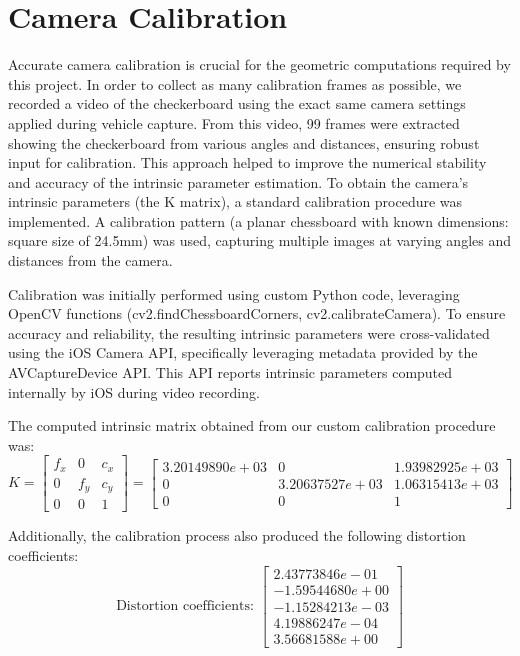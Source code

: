 \section{Camera Calibration}
Accurate camera calibration is crucial for the geometric computations required by this project. In order to collect as many calibration frames as possible, we recorded a video of the checkerboard using the exact same camera settings applied during vehicle capture. From this video, 99 frames were extracted showing the checkerboard from various angles and distances, ensuring robust input for calibration. This approach helped to improve the numerical stability and accuracy of the intrinsic parameter estimation. To obtain the camera's intrinsic parameters (the K matrix), a standard calibration procedure was implemented. A calibration pattern (a planar chessboard with known dimensions: square size of 24.5mm) was used, capturing multiple images at varying angles and distances from the camera.

Calibration was initially performed using custom Python code, leveraging OpenCV functions (cv2.findChessboardCorners, cv2.calibrateCamera). To ensure accuracy and reliability, the resulting intrinsic parameters were cross-validated using the iOS Camera API, specifically leveraging metadata provided by the AVCaptureDevice API. This API reports intrinsic parameters computed internally by iOS during video recording.

The computed intrinsic matrix  obtained from our custom calibration procedure was:
\begin{equation}
    K = \begin{bmatrix}
        f_x & 0 & c_x \\
        0 & f_y & c_y \\
        0 & 0 & 1
    \end{bmatrix} =
    \begin{bmatrix}
        3.20149890e+03 & 0 & 1.93982925e+03 \\
        0 & 3.20637527e+03 & 1.06315413e+03 \\
        0 & 0 & 1
    \end{bmatrix}
\end{equation}

Additionally, the calibration process also produced the following distortion coefficients:
\begin{equation}
    \text{Distortion coefficients: } \begin{bmatrix}
        2.43773846e-01 \\
        -1.59544680e+00 \\
        -1.15284213e-03 \\
        4.19886247e-04 \\
        3.56681588e+00
    \end{bmatrix}
\end{equation}

